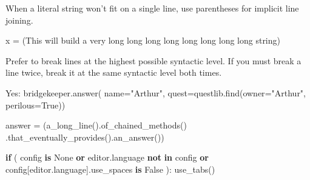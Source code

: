 \documentclass[
]{article}
\newenvironment{Shaded}{}{}
\newcommand{\ControlFlowTok}[1]{\textcolor[rgb]{0.00,0.44,0.13}{\textbf{#1}}}
\newcommand{\KeywordTok}[1]{\textcolor[rgb]{0.00,0.44,0.13}{\textbf{#1}}}
\newcommand{\NormalTok}[1]{#1}
\newcommand{\OperatorTok}[1]{\textcolor[rgb]{0.40,0.40,0.40}{#1}}
\newcommand{\StringTok}[1]{\textcolor[rgb]{0.25,0.44,0.63}{#1}}
\newcommand{\VariableTok}[1]{\textcolor[rgb]{0.10,0.09,0.49}{#1}}
\begin{document}
When a literal string won't fit on a single line, use parentheses for
implicit line joining.

\begin{samepage}
\begin{Shaded}
\begin{Highlighting}[]
\NormalTok{x }\OperatorTok{=}\NormalTok{ (}\StringTok{\textquotesingle{}This will build a very long long \textquotesingle{}}
     \StringTok{\textquotesingle{}long long long long long long string\textquotesingle{}}\NormalTok{)}
\end{Highlighting}
\end{Shaded}
\end{samepage}

Prefer to break lines at the highest possible syntactic level. If you
must break a line twice, break it at the same syntactic level both
times.

\begin{samepage}
\begin{Shaded}
\begin{Highlighting}[]
\NormalTok{Yes: bridgekeeper.answer(}
\NormalTok{         name}\OperatorTok{=}\StringTok{"Arthur"}\NormalTok{, quest}\OperatorTok{=}\NormalTok{questlib.find(owner}\OperatorTok{=}\StringTok{"Arthur"}\NormalTok{, perilous}\OperatorTok{=}\VariableTok{True}\NormalTok{))}

\NormalTok{     answer }\OperatorTok{=}\NormalTok{ (a\_long\_line().of\_chained\_methods()}
\NormalTok{               .that\_eventually\_provides().an\_answer())}

     \ControlFlowTok{if}\NormalTok{ (}
\NormalTok{         config }\KeywordTok{is} \VariableTok{None}
         \KeywordTok{or} \StringTok{\textquotesingle{}editor.language\textquotesingle{}} \KeywordTok{not} \KeywordTok{in}\NormalTok{ config}
         \KeywordTok{or}\NormalTok{ config[}\StringTok{\textquotesingle{}editor.language\textquotesingle{}}\NormalTok{].use\_spaces }\KeywordTok{is} \VariableTok{False}
\NormalTok{     ):}
\NormalTok{       use\_tabs()}
\end{Highlighting}
\end{Shaded}
\end{samepage}
\end{document}
